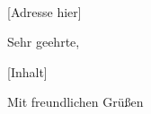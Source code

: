 \documentclass[ngerman]{etslttr}
\begin{document}
\author{}
\title {}

   {}
  {\mail{}\\\web{}}


  {}
    {}
  {}

\begin{letter}{[Adresse hier]}
  \opening{Sehr geehrte,}

  [Inhalt]
  
  \closing{Mit freundlichen Grüßen}
\end{letter}
\end{document}
